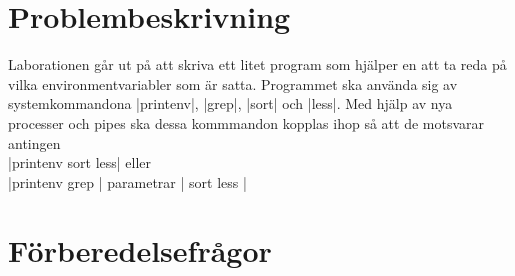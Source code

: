 \documentclass[paper=a4, fontsize=11pt]{scrartcl} %
\numberwithin{equation}{section} %
\numberwithin{figure}{section} %
\numberwithin{table}{section} %
\begin{document}
\section{Problembeskrivning}
Laborationen går ut på att skriva ett litet program som hjälper en att ta reda
på vilka environmentvariabler som är satta.
Programmet ska använda sig av systemkommandona |printenv|, |grep|, |sort|
och |less|.
Med hjälp av nya processer och pipes ska dessa kommmandon kopplas ihop
så att de motsvarar antingen
\\
|printenv  sort  less| eller \\
|printenv  grep | parametrar | sort  less | \\


\section{Förberedelsefrågor}
\end{document}
